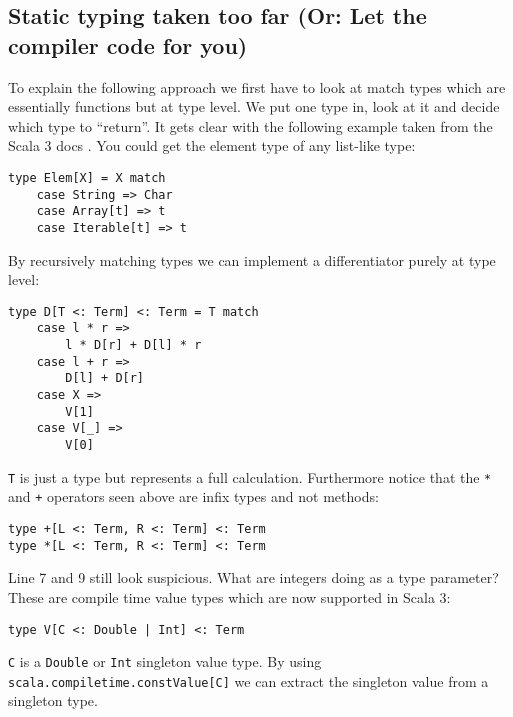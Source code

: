 \subsection{Static typing taken too far (Or: Let the compiler code for you)}
To explain the following approach we first have to look at match types which are essentially functions but at type level. We put one type in, look at it and decide which type to ``return''. It gets clear with the following example taken from the Scala 3 docs \cite{matchTypesScala3}. You could get the element type of any list-like type:
\begin{lstlisting}
type Elem[X] = X match
    case String => Char
    case Array[t] => t
    case Iterable[t] => t
\end{lstlisting}
By recursively matching types we can implement a differentiator purely at type level:
\begin{lstlisting}
type D[T <: Term] <: Term = T match
    case l * r => 
        l * D[r] + D[l] * r
    case l + r => 
        D[l] + D[r]
    case X => 
        V[1]
    case V[_] => 
        V[0]
\end{lstlisting}
\lstinline{T} is just a type but represents a full calculation. Furthermore notice that the \lstinline{*} and \lstinline{+} operators seen above are infix types and not methods:
\begin{lstlisting}
type +[L <: Term, R <: Term] <: Term
type *[L <: Term, R <: Term] <: Term
\end{lstlisting}
Line 7 and 9 still look suspicious. What are integers doing as a type parameter? These are compile time value types which are now supported in Scala 3:
\begin{lstlisting}
type V[C <: Double | Int] <: Term
\end{lstlisting}
\lstinline{C} is a \lstinline{Double} or \lstinline{Int} singleton value type. By using \lstinline{scala.compiletime.constValue[C]} we can extract the singleton value from a singleton type.

